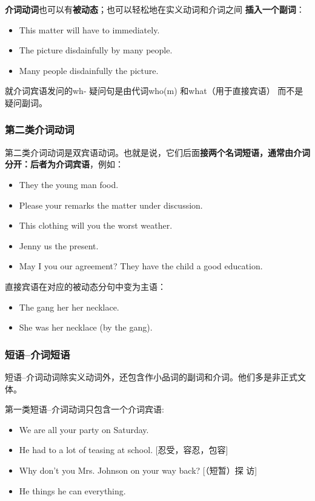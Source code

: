 \textbf{介词动词}也可以有\textbf{被动态}；也可以轻松地在实义动词和介词之间
\textbf{插入一个副词}：
\begin{itemize}
\item This matter will have to  immediately.
\item The picture  disdainfully by many people.
\item Many people  disdainfully  the picture.
\end{itemize}

就介词宾语发问的wh- 疑问句是由代词who(m) 和what（用于直接宾语） 而不是疑问副词。

\subsubsection{第二类介词动词}

第二类介词动词是双宾语动词。也就是说，它们后面\textbf{接两个名词短语，通常由介词
分开：后者为介词宾语}，例如：

\begin{itemize}
\item They  the young man  food.
\item Please  your remarks  the matter under discussion.
\item This clothing will  you  the worst weather.
\item Jenny  us  the present.
\item May I  you  our agreement? They have 
the child  a good education.
\end{itemize}直接宾语在对应的被动态分句中变为主语：
\begin{itemize}
\item The gang  her  her necklace.
\item She was  her necklace (by the gang).
\end{itemize}

\subsubsection{短语--介词短语}

短语--介词动词除实义动词外，还包含作小品词的副词和介词。他们多是非正式文体。

第一类短语--介词动词只包含一个介词宾语:
\begin{itemize}
\item We are all  your party on Saturday.

\item He had to  a lot of teasing at school. [忍受，容忍，包容]

\item Why don't you  Mrs. Johnson on your way back? [（短暂）探
访]

\item He things he can  everything.
\end{itemize}


